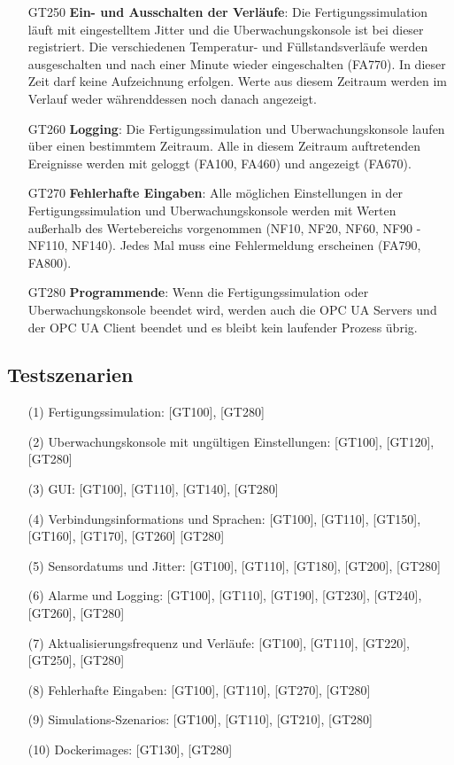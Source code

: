 \documentclass[parskip=full]{scrartcl}
\begin{document}
\begin{enumerate}
  \item[GT250] \textbf{Ein- und Ausschalten der Verläufe}: Die \gls{Fertigungssimulation} läuft mit eingestelltem \gls{Jitter} und die \gls{Uberwachungskonsole} ist bei dieser registriert.
   Die verschiedenen Temperatur- und Füllstandsverläufe werden ausgeschalten und nach einer Minute wieder eingeschalten (FA770). In dieser Zeit darf keine Aufzeichnung erfolgen.
   Werte aus diesem Zeitraum werden im Verlauf weder währenddessen noch danach angezeigt.
  \item[GT260] \textbf{Logging}: Die \gls{Fertigungssimulation} und \gls{Uberwachungskonsole} laufen über einen bestimmtem Zeitraum. Alle in diesem Zeitraum auftretenden Ereignisse werden mit geloggt (FA100, FA460) und angezeigt (FA670).
  \item[GT270] \textbf{Fehlerhafte Eingaben}: Alle möglichen Einstellungen in der \gls{Fertigungssimulation} und \gls{Uberwachungskonsole} werden mit Werten außerhalb des Wertebereichs vorgenommen (NF10, NF20, NF60, NF90 - NF110, NF140).
   Jedes Mal muss eine Fehlermeldung erscheinen (FA790, FA800).
  \item[GT280] \textbf{Programmende}: Wenn die \gls{Fertigungssimulation} oder \gls{Uberwachungskonsole} beendet wird, werden auch die \glspl{OPC UA Server} und der \gls{OPC UA Client} beendet und es bleibt kein
   laufender Prozess übrig.
\end{enumerate}

\subsection{Testszenarien}
\begin{enumerate}
  \item[(1)] \gls{Fertigungssimulation}: [GT100], [GT280]
  \item[(2)] \gls{Uberwachungskonsole} mit ungültigen Einstellungen: [GT100], [GT120], [GT280]
  \item[(3)] \gls{GUI}: [GT100], [GT110], [GT140], [GT280]
  \item[(4)] \glspl{Verbindungsinformation} und Sprachen: [GT100], [GT110], [GT150], [GT160], [GT170], [GT260] [GT280]
  \item[(5)] \glspl{Sensordatum} und \gls{Jitter}: [GT100], [GT110], [GT180], [GT200], [GT280]
  \item[(6)] Alarme und Logging: [GT100], [GT110], [GT190], [GT230], [GT240], [GT260], [GT280]
  \item[(7)] Aktualisierungsfrequenz und Verläufe: [GT100], [GT110], [GT220], [GT250], [GT280]
  \item[(8)] Fehlerhafte Eingaben: [GT100], [GT110], [GT270], [GT280]
  \item[(9)] \glspl{Simulations-Szenario}: [GT100], [GT110], [GT210], [GT280]
  \item[(10)] \glspl{Dockerimage}: [GT130], [GT280]
\end{enumerate}
\end{document}
